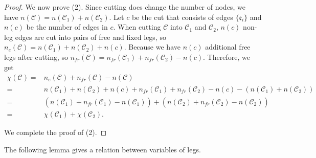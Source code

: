 \begin{proof}
We now prove (2). Since cutting does change the number of nodes, we have $n(\mathcal{C})=n(\mathcal{C}_1)+n(\mathcal{C}_2)$. Let $c$ be the cut that consists of edges $\{\mathfrak{e}_{i}\}$ and $n(c)$ be the number of edges in $c$. 
When cutting $\mathcal{C}$ into $\mathcal{C}_1$ and $\mathcal{C}_2$, $n(c)$ non-leg edges are cut into pairs of free and fixed legs, so $n_e(\mathcal{C})=n(\mathcal{C}_1)+n(\mathcal{C}_2)+n(c)$. Because we have $n(c)$ additional free legs after cutting, so $n_{\textit{fr}}(\mathcal{C})=n_{\textit{fr}}(\mathcal{C}_1)+n_{\textit{fr}}(\mathcal{C}_2)-n(c)$. Therefore, we get
\begin{equation}
\begin{split}
    \chi(\mathcal{C})=&n_e(\mathcal{C})+n_{\textit{fr}}(\mathcal{C})-n(\mathcal{C})
    \\
    =&n(\mathcal{C}_1)+n(\mathcal{C}_2)+n(c)+n_{\textit{fr}}(\mathcal{C}_1)+n_{\textit{fr}}(\mathcal{C}_2)-n(c)-(n(\mathcal{C}_1)+n(\mathcal{C}_2))
    \\
    =&(n(\mathcal{C}_1)+n_{\textit{fr}}(\mathcal{C}_1)-n(\mathcal{C}_1))+(n(\mathcal{C}_2)+n_{\textit{fr}}(\mathcal{C}_2)-n(\mathcal{C}_2))
    \\
    =&\chi(\mathcal{C}_1)+\chi(\mathcal{C}_2).
\end{split}
\end{equation}

We complete the proof of (2).
\end{proof}

The following lemma gives a relation between variables of legs.

